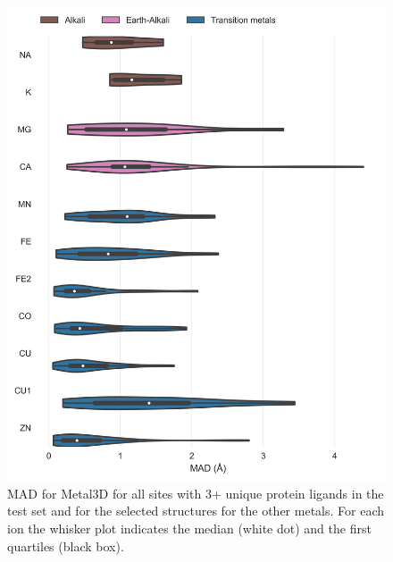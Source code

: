 \documentclass[ lineno,
  9pt]{elife}
\newenvironment{fignos:tagged-figure}[1][]{
  \let\oldthefigure\thefigure
  \let\oldtheHfigure\theHfigure
  \renewcommand{\thefigure}{#1}
  \renewcommand{\theHfigure}{#1}
}{
  \let\thefigure\oldthefigure
  \let\theHfigure\oldtheHfigure
  \addtocounter{figure}{-1}
}
\begin{document}
\begin{fignos:tagged-figure}[S5]

\begin{figure}
\hypertarget{fig:selectivity-distance-metal3d}{%
\centering
\includegraphics{images/model_0.5metal3D_distances_violin_0.5.jpg}
\caption{MAD for Metal3D for all sites with 3+ unique protein ligands in the test set and for the selected structures for the other metals. For each ion the whisker plot indicates the median (white dot) and the first quartiles (black box).}\label{fig:selectivity-distance-metal3d}
}
\end{figure}

\end{fignos:tagged-figure}
\end{document}
